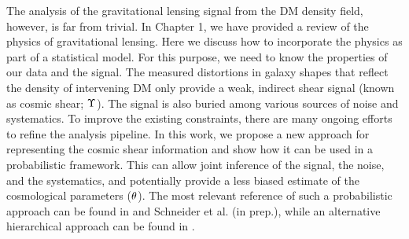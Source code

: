 The analysis of the gravitational lensing signal from the DM density field, however, is far from trivial. 
In Chapter 1, we have provided a review of the physics of gravitational lensing. 
Here we discuss how to incorporate the physics as part of a statistical model. 
For this purpose, we need to know the properties of our data and the signal.
The measured distortions in galaxy shapes that reflect the density of intervening DM 
only provide a weak, indirect shear signal (known as cosmic
shear; $\Upsilon$). The signal is also buried among various sources of noise
and systematics. 
To improve the existing constraints, there are many ongoing 
efforts to refine the analysis pipeline. 
In this work, we propose a new approach for representing 
the cosmic shear information and show how it can be used in a probabilistic framework. 
This can allow joint inference of the signal, the noise, and the systematics, 
and potentially provide a less biased estimate of the cosmological parameters 
(${\bf \theta}$). 
The most relevant reference of such a probabilistic approach can be found in 
\cite{Schneider2014} and Schneider et al. (in prep.), 
while an alternative hierarchical approach can be found in \cite{Alsing2015}. 

